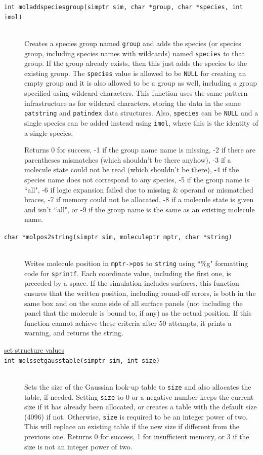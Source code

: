 \documentclass {scrbook}
\newcommand {\ttt} {\texttt}
\begin{document}
\begin{description}
\item[\ttt{int moladdspeciesgroup(simptr sim, char *group, char *species, int imol)}]
\hfill \\
Creates a species group named \ttt{group} and adds the species (or species group, including species names with wildcards) named \ttt{species} to that group. If the group already exists, then this just adds the species to the existing group. The \ttt{species} value is allowed to be \ttt{NULL} for creating an empty group and it is also allowed to be a group as well, including a group specified using wildcard characters. This function uses the same pattern infrastructure as for wildcard characters, storing the data in the same \ttt{patstring} and \ttt{patindex} data structures. Also, \ttt{species} can be \ttt{NULL} and a single species can be added instead using \ttt{imol}, where this is the identity of a single species.

Returns 0 for success, -1 if the group name name is missing, -2 if there are parentheses mismatches (which shouldn't be there anyhow), -3 if a molecule state could not be read (which shouldn't be there), -4 if the species name does not correspond to any species, -5 if the group name is ``all", -6 if logic expansion failed due to missing \& operand or mismatched braces, -7 if memory could not be allocated, -8 if a molecule state is given and isn't ``all", or -9 if the group name is the same as an existing molecule name.

\item[\ttt{char *molpos2string(simptr sim, moleculeptr mptr, char *string)}]
\hfill \\
Writes molecule position in \ttt{mptr->pos} to \ttt{string} using ``\%g" formatting code for \ttt{sprintf}. Each coordinate value, including the first one, is preceded by a space. If the simulation includes surfaces, this function ensures that the written position, including round-off errors, is both in the same box and on the same side of all surface panels (not including the panel that the molecule is bound to, if any) as the actual position. If this function cannot achieve these criteria after 50 attempts, it prints a warning, and returns the string.

\item[\underline{set structure values}]

\item[\ttt{int molssetgausstable(simptr sim, int size)}]
\hfill \\
Sets the size of the Gaussian look-up table to \ttt{size} and also allocates the table, if needed. Setting \ttt{size} to 0 or a negative number keeps the current size if it has already been allocated, or creates a table with the default size (4096) if not. Otherwise, \ttt{size} is required to be an integer power of two. This will replace an existing table if the new size if different from the previous one. Returns 0 for success, 1 for insufficient memory, or 3 if the size is not an integer power of two.


\end{description}
\end{document}
